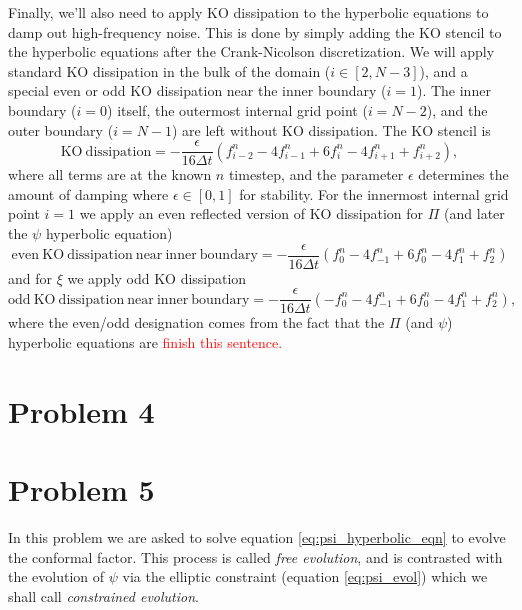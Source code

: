 \documentclass[12pt]{article}
\numberwithin{equation}{section}
\newcommand{\redtext}[1]{\textcolor{red}{#1}}
\begin{document}
Finally, we'll also need to apply KO dissipation to the hyperbolic equations to damp out high-frequency noise.  This is done by simply adding the KO stencil to the hyperbolic equations after the Crank-Nicolson discretization.  We will apply standard KO dissipation in the bulk of the domain ($i \in [2, N-3]$), and a special even or odd KO dissipation near the inner boundary ($i = 1$).  The inner boundary ($i=0$) itself, the outermost internal grid point ($i = N-2$), and the outer boundary ($i = N-1$) are left without KO dissipation.  The KO stencil is
\begin{equation}
\mathrm{KO~dissipation} = -\frac{\epsilon}{16 \Delta t} (f^{n}_{i-2} - 4 f^{n}_{i-1} + 6 f^{n}_{i} - 4 f^{n}_{i+1} + f^{n}_{i+2}),
\end{equation}
where all terms are at the known $n$ timestep, and the parameter $\epsilon$ determines the amount of damping where $\epsilon \in [0, 1]$ for stability.  For the innermost internal grid point $i = 1$ we apply an even reflected version of KO dissipation for $\Pi$ (and later the $\psi$ hyperbolic equation)
\begin{equation}
\mathrm{even~KO~dissipation~near~inner~boundary} = -\frac{\epsilon}{16 \Delta t} (f^{n}_{0} - 4 f^{n}_{-1} + 6 f^{n}_{0} - 4 f^{n}_{1} + f^{n}_{2})
\end{equation}
and for $\xi$ we apply odd KO dissipation
\begin{equation}
\mathrm{odd~KO~dissipation~near~inner~boundary} = -\frac{\epsilon}{16 \Delta t} (-f^{n}_{0} - 4 f^{n}_{-1} + 6 f^{n}_{0} - 4 f^{n}_{1} + f^{n}_{2}),
\end{equation}
where the even/odd designation comes from the fact that the $\Pi$ (and $\psi$) hyperbolic equations are \redtext{finish this sentence.}

\section{Problem 4}

\section{Problem 5}
In this problem we are asked to solve equation \ref{eq:psi_hyperbolic_eqn} to evolve the conformal factor.  This process is called \textit{free evolution}, and is contrasted with the evolution of $\psi$ via the elliptic constraint (equation \ref{eq:psi_evol}) which we shall call \textit{constrained evolution}.  
\end{document}
